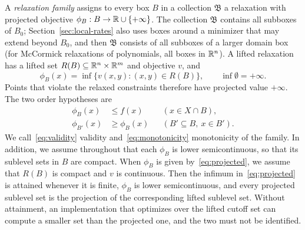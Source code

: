A \emph{relaxation family} assigns to every box $B$ in a collection
$\mathfrak B$ a relaxation with projected objective
$\phi_B:B\to\mathbb{R}\cup\{+\infty\}$. The collection $\mathfrak B$ contains all
subboxes of $B_0$; Section~\ref{sec:local-rates} also uses boxes around a
minimizer that may extend beyond $B_0$, and then $\mathfrak B$ consists of
all subboxes of a larger domain box (for McCormick relaxations of
polynomials, all boxes in $\mathbb{R}^n$). A lifted relaxation has a lifted set
$R(B)\subseteq\mathbb{R}^n\times\mathbb{R}^m$ and objective $v$, and
\begin{equation}\label{eq:projected}
  \phi_B(x)=\inf\{v(x,y):(x,y)\in R(B)\},\qquad\inf\emptyset=+\infty.
\end{equation}
Points that violate the relaxed constraints therefore have projected value
$+\infty$. The two order hypotheses are
\begin{align}
  \phi_B(x)&\le f(x)&&(x\in X\cap B),\label{eq:validity}\\
  \phi_{B'}(x)&\ge\phi_B(x)&&(B'\subseteq B,\ x\in B').
  \label{eq:monotonicity}
\end{align}
We call~\eqref{eq:validity} validity and~\eqref{eq:monotonicity}
monotonicity of the family. In addition, we assume throughout that each
$\phi_B$ is lower semicontinuous, so that its sublevel sets in $B$ are
compact. When $\phi_B$ is given by~\eqref{eq:projected}, we assume that
$R(B)$ is compact and $v$ is continuous. Then the infimum
in~\eqref{eq:projected} is attained whenever it is finite, $\phi_B$ is
lower semicontinuous, and every projected sublevel set is the projection
of the corresponding lifted sublevel set. Without attainment, an
implementation that optimizes over the lifted cutoff set can compute a
smaller set than the projected one, and the two must not be identified.

